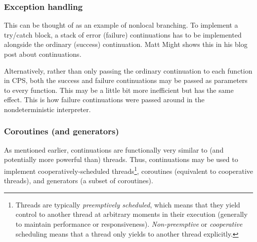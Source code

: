 \documentclass[]{article}
\begin{document}
\subsubsection{Exception handling}
\label{sec:excp}

This can be thought of as an example of nonlocal branching. To implement a try/catch block, a stack of error (failure) continuations has to be implemented alongside the ordinary (success) continuation. Matt Might shows this in his blog post about continuations.

Alternatively, rather than only passing the ordinary continuation to each function in CPS, both the success and failure continuations may be passed as parameters to every function. This may be a little bit more inefficient but has the same effect. This is how failure continuations were passed around in the nondeterministic interpreter.

\subsubsection{Coroutines (and generators)}
\label{sec:coro}

As mentioned earlier, continuations are functionally very similar to (and potentially more powerful than) threads. Thus, continuations may be used to implement cooperatively-scheduled threads\footnote{Threads are typically \textit{preemptively scheduled}, which means that they yield control to another thread at arbitrary moments in their execution (generally to maintain performance or responsiveness). \textit{Non-preemptive} or \textit{cooperative} scheduling means that a thread only yields to another thread explicitly.}, coroutines (equivalent to cooperative threads), and generators (a subset of coroutines).
\end{document}
